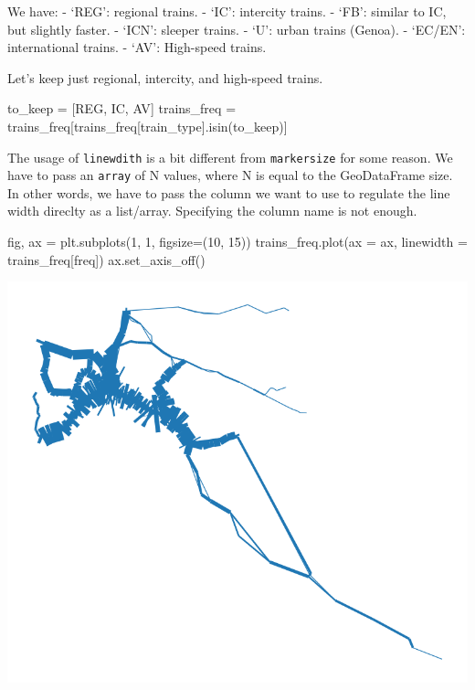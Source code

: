 \documentclass[
  letterpaper,
  DIV=11,
  numbers=noendperiod]{scrreprt}
\newenvironment{Shaded}{\begin{snugshade}}{\end{snugshade}}
\newcommand{\DecValTok}[1]{\textcolor[rgb]{0.68,0.00,0.00}{#1}}
\newcommand{\NormalTok}[1]{\textcolor[rgb]{0.00,0.23,0.31}{#1}}
\newcommand{\OperatorTok}[1]{\textcolor[rgb]{0.37,0.37,0.37}{#1}}
\newcommand{\StringTok}[1]{\textcolor[rgb]{0.13,0.47,0.30}{#1}}
\begin{document}
We have: - `REG': regional trains. - `IC': intercity trains. - `FB':
similar to IC, but slightly faster. - `ICN': sleeper trains. - `U':
urban trains (Genoa). - `EC/EN': international trains. - `AV':
High-speed trains.

Let's keep just regional, intercity, and high-speed trains.

\begin{Shaded}
\begin{Highlighting}[]
\NormalTok{to\_keep }\OperatorTok{=}\NormalTok{ [}\StringTok{\textquotesingle{}REG\textquotesingle{}}\NormalTok{, }\StringTok{\textquotesingle{}IC\textquotesingle{}}\NormalTok{, }\StringTok{\textquotesingle{}AV\textquotesingle{}}\NormalTok{]}
\NormalTok{trains\_freq }\OperatorTok{=}\NormalTok{ trains\_freq[trains\_freq[}\StringTok{\textquotesingle{}train\_type\textquotesingle{}}\NormalTok{].isin(to\_keep)]}
\end{Highlighting}
\end{Shaded}

The usage of \texttt{linewdith} is a bit different from
\texttt{markersize} for some reason. We have to pass an \texttt{array}
of N values, where N is equal to the GeoDataFrame size. In other words,
we have to pass the column we want to use to regulate the line width
direclty as a list/array. Specifying the column name is not enough.

\begin{Shaded}
\begin{Highlighting}[]
\NormalTok{fig, ax }\OperatorTok{=}\NormalTok{ plt.subplots(}\DecValTok{1}\NormalTok{, }\DecValTok{1}\NormalTok{, figsize}\OperatorTok{=}\NormalTok{(}\DecValTok{10}\NormalTok{, }\DecValTok{15}\NormalTok{))}
\NormalTok{trains\_freq.plot(ax }\OperatorTok{=}\NormalTok{ ax, linewidth }\OperatorTok{=}\NormalTok{ trains\_freq[}\StringTok{\textquotesingle{}freq\textquotesingle{}}\NormalTok{])}
\NormalTok{ax.set\_axis\_off()}
\end{Highlighting}
\end{Shaded}

\includegraphics{labs/w02_maps_files/figure-pdf/cell-55-output-1.png}
\end{document}
